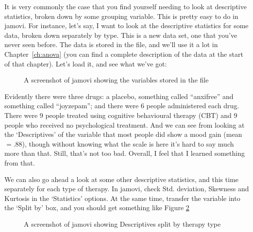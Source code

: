 It is very commonly the case that you find yourself needing to look at descriptive statistics, broken down by some grouping variable. This is pretty easy to do in jamovi. For instance, let's  say, I want to look at the descriptive statistics for some  data, broken down separately by  type. This is a new data set, one that you've never seen before. The data is stored in the  file, and we'll use it a lot in Chapter~\ref{ch:anova} (you can find a complete description of the data at the start of that chapter). Let's load it, and see what we've got:

\vspace{1cm}
\begin{figure}[ht]
\begin{center}
\caption{A screenshot of jamovi showing the variables stored in the  file}
\label{fig:clinicaltrial}
\HR
\end{center}
\end{figure}

Evidently there were three drugs: a placebo, something called ``anxifree'' and something called ``joyzepam''; and there were 6 people administered each drug. There were 9 people treated using cognitive behavioural therapy (CBT) and 9 people who received no psychological treatment. And we can see from looking at the `Descriptives' of the  variable that most people did show a mood gain (mean $=.88$), though without knowing what the scale is here it's hard to say much more than that. Still, that's not too bad. Overall, I feel that I learned something from that.

We can also go ahead a look at some other descriptive statistics, and this time separately for each type of therapy. In jamovi, check Std. deviation, Skewness and Kurtosis in the `Statistics' options. At the same time, transfer the  variable into the `Split by' box, and you should get something like Figure \ref{fig:clinicaltrial_grouping}

\vspace{1cm}
\begin{figure}[ht]
\begin{center}
\caption{A screenshot of jamovi showing Descriptives split by therapy type}
\label{fig:clinicaltrial_grouping}
\HR
\end{center}
\end{figure}

